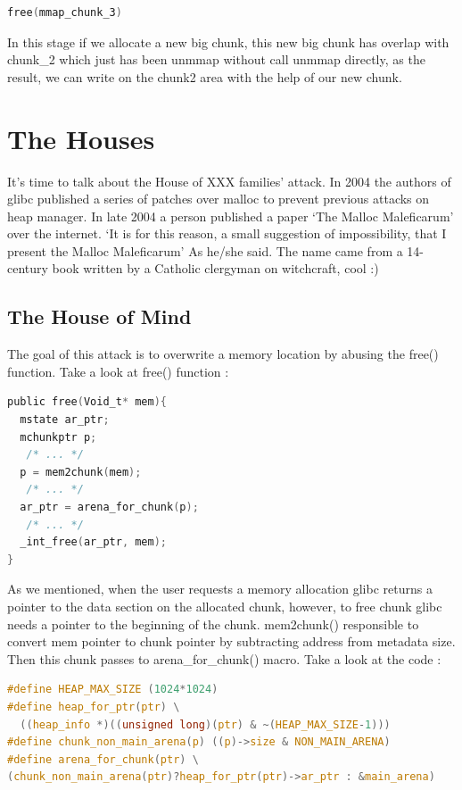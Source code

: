 \documentclass{masterthesis}
\newcommand*\libc{glibc}
\begin{document}
\begin{lstlisting}[language=c,frame=tlrb]
free(mmap_chunk_3)
 \end{lstlisting}
 
In this stage if we allocate a new big chunk, this new big chunk has overlap with chunk\_2 which just has been unmmap without call unmmap directly, as the result, we can write on the chunk2 area with the help of our new chunk.

\section{The Houses}

It's time to talk about the House of XXX families' attack. In 2004 the authors of \libc{} published a series of patches over malloc to prevent previous attacks on heap manager. In late 2004 a person published a paper ‘The Malloc Maleficarum’ over the internet. ‘It is for this reason, a small suggestion of impossibility, that I present the Malloc Maleficarum’ As he/she said. The name came from a 14-century book written by a Catholic clergyman on witchcraft, cool :)

\subsection{The House of Mind}
The goal of this attack is to overwrite a memory location by abusing the free() function. Take a look at free() function : 
\begin{lstlisting}[language=c,frame=tlrb]
public free(Void_t* mem){
  mstate ar_ptr;
  mchunkptr p;    
   /* ... */ 
  p = mem2chunk(mem);
   /* ... */ 
  ar_ptr = arena_for_chunk(p);
   /* ... */ 
  _int_free(ar_ptr, mem);
}
 \end{lstlisting}
As we mentioned, when the user requests a memory allocation \libc{} returns a pointer to the data section on the allocated chunk, however, to free chunk \libc{} needs a pointer to the beginning of the chunk. mem2chunk() responsible to convert mem pointer to chunk pointer by subtracting address from metadata size. Then this chunk passes to arena\_for\_chunk() macro. Take a look at the code : 

\begin{lstlisting}[language=c,frame=tlrb]
#define HEAP_MAX_SIZE (1024*1024)
#define heap_for_ptr(ptr) \
  ((heap_info *)((unsigned long)(ptr) & ~(HEAP_MAX_SIZE-1)))
#define chunk_non_main_arena(p) ((p)->size & NON_MAIN_ARENA)
#define arena_for_chunk(ptr) \
(chunk_non_main_arena(ptr)?heap_for_ptr(ptr)->ar_ptr : &main_arena)
 \end{lstlisting}
 
\end{document}
